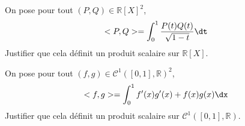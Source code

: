 \documentclass[a4paper,10pt]{report}
\begin{document}
\begin{Exa}\label{PS} On pose pour tout $(P,Q) \in \mathbb{R}[X]^2$,
$$ <P,Q> = \int_{0}^1 \dfrac{P(t)Q(t)}{\sqrt{1-t}} \dt $$
Justifier que cela définit un produit scalaire sur $\mathbb{R}[X]$.
\end{Exa}

%
%
%


\begin{Exa} \label{PS2} On pose pour tout $(f,g) \in \mathcal{C}^1([0,1],\mathbb{R})^2$,
$$ <f,g> = \int_{0}^1 f'(x)g'(x)+f(x)g(x) \dx$$
Justifier que cela définit un produit scalaire sur $\mathcal{C}^1([0,1],\mathbb{R})$.
\end{Exa} 
\end{document}
